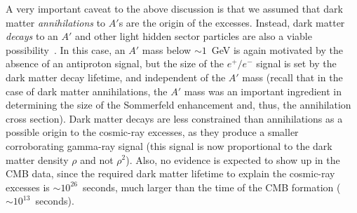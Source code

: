 A very important caveat to the above discussion is that we assumed that dark matter \emph{annihilations} to $A'$s are the origin of the excesses.  
Instead, dark matter \emph{decays} to an $A'$ and other light hidden sector particles are also a viable 
possibility~\cite{Essig:2010ye,Ruderman:2009tj}.  
In this case, an $A'$ mass 
below $\sim 1$~GeV is again motivated by the absence of an antiproton signal, but the size of the $e^+/e^-$ signal is set by the 
dark matter decay lifetime, and independent of the $A'$ mass (recall that in the case of dark matter annihilations, the $A'$ mass was an important 
ingredient in determining the size of the Sommerfeld enhancement and, thus, the annihilation cross section).  
Dark matter decays are less constrained than annihilations as a possible origin to the cosmic-ray excesses, as they produce a smaller 
corroborating gamma-ray signal (this signal is now proportional to the dark matter density $\rho$ and not $\rho^2$).  Also, no 
evidence is expected to show up in the CMB data, since the required dark matter lifetime to explain the cosmic-ray excesses is $\sim 10^{26}$~seconds, much larger than the time of the CMB formation ($\sim 10^{13}$~seconds).  


